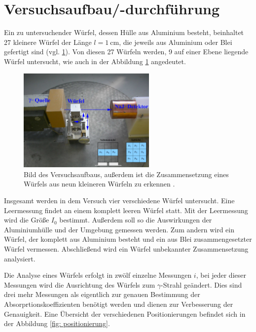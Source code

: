 \section{Versuchsaufbau/-durchführung}
Ein zu untersuchender Würfel, dessen Hülle aus Aluminium besteht, beinhaltet 27 kleinere Würfel der Länge $l=\SI{1}{\centi\meter}$,
die jeweils aus Aluminium oder Blei gefertigt sind (vgl. \ref{fig: aufbau}).
Von diesen 27 Würfeln werden, 9 auf einer Ebene liegende Würfel untersucht, wie auch in der Abbildung \ref{fig: aufbau} angedeutet.

\begin{figure}[h]
  \centering
  \includegraphics[width=0.6\textwidth]{pics/Aufbau.pdf}
  \caption{Bild des Versuchsaufbaus, außerdem ist die Zusammensetzung eines Würfels aus neun kleineren Würfeln zu erkennen \cite{anleitungb14}.}
  \label{fig: aufbau}
\end{figure}

Insgesamt werden in dem Versuch vier verschiedene Würfel untersucht. Eine Leermessung findet an
einem komplett leeren Würfel statt. Mit der Leermessung wird die Größe $I_0$ bestimmt. %
Außerdem soll so die Auswirkungen der Aluminiumhülle und der Umgebung gemessen werden.
Zum andern wird ein Würfel, der komplett aus Aluminium besteht und %
ein aus Blei zusammengesetzter Würfel vermessen. Abschließend wird ein Würfel
unbekannter Zusammensetzung analysiert.

Die Analyse eines Würfels erfolgt in zwölf einzelne Messungen $i$, %
bei jeder dieser Messungen wird die Ausrichtung des Würfels zum $\gamma$-Strahl geändert.
Dies sind drei mehr Messungen als eigentlich zur genauen Bestimmung der Absorprtionskoeffizienten %
benötigt werden und dienen zur Verbesserung der Genauigkeit. %
Eine Übersicht der verschiedenen Positionierungen befindet sich in der Abbildung \ref{fig: positionierung}.

